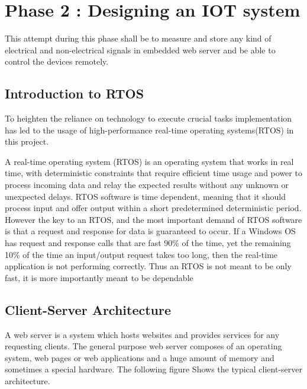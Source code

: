 \documentclass{FR16}
\begin{document}
\begin{enumerate}
\begin{figure}[H]
\label{fig6}
\end{figure}


\end{enumerate}

\newpage

\section{Phase 2 : Designing an IOT system}
This attempt during this phase shall be to measure and store any kind of electrical and non-electrical signals in embedded web server and be able to control the devices remotely.

\subsection{Introduction to RTOS}
To  heighten the  reliance on technology to execute crucial tasks implementation has led to the usage of high-performance real-time operating systems(RTOS) in this project. 

A real-time operating system (RTOS) is an operating system that works in real time, with deterministic constraints that require efficient time usage and power to process incoming data and relay the expected results without any unknown or unexpected delays. RTOS software is time dependent, meaning that it should process input and offer output within a short predetermined deterministic period. However the key to an RTOS, and the most important demand of RTOS software is that a request and response for data is guaranteed to occur. If a Windows OS has request and response calls that are fast 90\% of the time, yet the remaining 10\% of the time an input/output request takes too long, then the real-time application is not performing correctly. Thus an RTOS is not meant to be only fast, it is more importantly meant to be dependable

\subsection{Client-Server Architecture}
A web server is a system which hosts websites and provides services for any requesting clients. The general
purpose web server composes of an operating system, web pages or web applications and a huge amount of memory
and sometimes a special hardware. The following figure Shows the typical client-server architecture.
\end{document}
